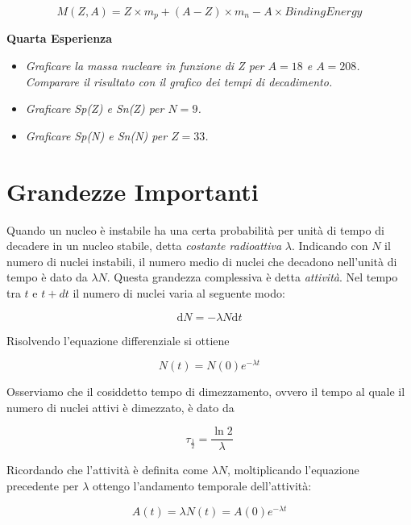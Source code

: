 \begin{equation}
M(Z,A)=Z\times m_p+(A-Z)\times m_n-A\times BindingEnergy
\end{equation}

\textbf{Quarta Esperienza}

\begin{itemize}
\item \emph{Graficare la massa nucleare in funzione di Z per $A=18$ e $A=208$. Comparare il risultato con il grafico dei tempi di decadimento.}
\item \emph{Graficare Sp(Z) e Sn(Z) per $N=9$.}
\item \emph{Graficare Sp(N) e Sn(N) per $Z=33$.}
\end{itemize}


\section{Grandezze Importanti}

Quando un nucleo è instabile ha una certa probabilità per unità di tempo di decadere in un nucleo stabile, detta \emph{costante radioattiva} $\lambda$. 
Indicando con $N$ il numero di nuclei instabili, il numero medio di nuclei che decadono nell'unità di tempo è dato da $\lambda N$. Questa grandezza complessiva è detta \emph{attività}. Nel tempo tra $t$ e $t+dt$ il numero di nuclei varia al seguente modo:

\begin{equation}
\mathrm{d}N=-\lambda N \mathrm{d}t
\end{equation}

Risolvendo l'equazione differenziale si ottiene

\begin{equation}
N(t)=N(0)e^{-\lambda t}
\end{equation}

Osserviamo che il cosiddetto tempo di dimezzamento, ovvero il tempo al quale il numero di nuclei attivi è dimezzato, è dato da

\begin{equation}
\tau_{\frac{1}{2}}=\frac{\ln2}{\lambda}
\end{equation}

Ricordando che l'attività è definita come $\lambda N$, moltiplicando l'equazione precedente per $\lambda$ ottengo l'andamento temporale dell'attività:

\begin{equation}
A(t)=\lambda N(t)=A(0)e^{-\lambda t}
\end{equation}


